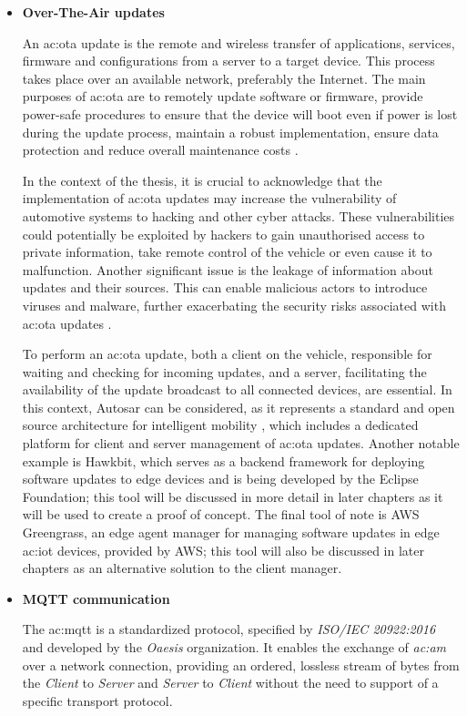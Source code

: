 \begin{itemize}
    \item[] \textbf{Over-The-Air updates}
    
    An \gls{ac:ota} update is the remote and wireless transfer of applications, services, firmware and configurations from a server to a target device. This process takes place over an available network, preferably the Internet. The main purposes of \gls{ac:ota} are to remotely update software or firmware, provide power-safe procedures to ensure that the device will boot even if power is lost during the update process, maintain a robust implementation, ensure data protection and reduce overall maintenance costs \cite{Open-sourceSWUpdate}.

    In the context of the thesis, it is crucial to acknowledge that the implementation of \gls{ac:ota} updates may increase the vulnerability of automotive systems to hacking and other cyber attacks. These vulnerabilities could potentially be exploited by hackers to gain unauthorised access to private information, take remote control of the vehicle or even cause it to malfunction. Another significant issue is the leakage of information about updates and their sources. This can enable malicious actors to introduce viruses and malware, further exacerbating the security risks associated with \gls{ac:ota} updates \cite{EnhancedMulti-LevelSecureUpdate}. 
    
    To perform an \gls{ac:ota} update, both a client on the vehicle, responsible for waiting and checking for incoming updates, and a server, facilitating the availability of the update broadcast to all connected devices, are essential. In this context, Autosar can be considered, as it represents a standard and open source architecture for intelligent mobility \cite{AutosarAbout}, which includes a dedicated platform for client and server management of \gls{ac:ota} updates. Another notable example is Hawkbit, which serves as a backend framework for deploying software updates to edge devices and is being developed by the Eclipse Foundation; this tool will be discussed in more detail in later chapters as it will be used to create a proof of concept. The final tool of note is AWS Greengrass, an edge agent manager for managing software updates in edge \gls{ac:iot} devices, provided by AWS; this tool will also be discussed in later chapters as an alternative solution to the client manager.
    
    \item[] \textbf{MQTT communication}
    
    The \gls{ac:mqtt} is a standardized protocol, specified by \textit{ISO/IEC 20922:2016} and developed by the \textit{Oaesis} organization. It enables the exchange of \textit{\gls{ac:am}} over a network connection, providing an ordered, lossless stream of bytes from the \textit{Client} to \textit{Server} and \textit{Server} to \textit{Client} without the need to support of a specific transport protocol.


\end{itemize}
